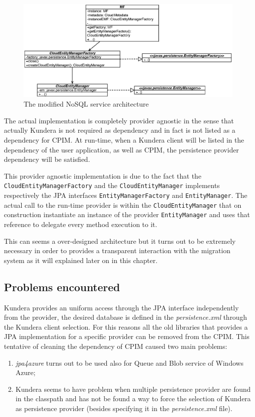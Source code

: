 \begin{figure}[tbh]
  \centering
  \includegraphics[width=14cm]{images/cpim_nosql_kundera}
  \caption{The modified NoSQL service architecture}
  \label{fig:cpim-kundera}
\end{figure}

\noindent The actual implementation is completely provider agnostic in the sense that actually Kundera is not required as dependency and in fact is not listed as a dependency for CPIM. At run-time, when a Kundera client will be listed in the dependency of the user application, as well as CPIM, the persistence provider dependency will be satisfied.

\noindent This provider agnostic implementation is due to the fact that the \texttt{CloudEntityManagerFactory} and the \texttt{CloudEntityManager} implements respectively the JPA interfaces  \texttt{EntityManagerFactory}  and \texttt{EntityManager}.
The actual call to the run-time provider is within the \texttt{CloudEntityManager} that on construction instantiate an instance of the provider \texttt{EntityManager} and uses that reference to delegate every method execution to it.

\noindent This can seems a over-designed architecture but it turns out to be extremely necessary in order to provides a transparent interaction with the migration system as it will explained later on in this chapter.

\subsection{Problems encountered}
Kundera provides an uniform access through the JPA interface independently from the provider, the desired database is defined in the \textit{persistence.xml} through the Kundera client selection. For this reasons all the old libraries that provides a JPA implementation for a specific provider can be removed from the CPIM. 
This tentative of cleaning the dependency of CPIM caused two main problems:
\begin{enumerate}
\item \textit{jpa4azure} turns out to be used also for Queue and Blob service of Windows Azure;
\item Kundera seems to have problem when multiple persistence provider are found in the classpath and has not be found a way to force the selection of Kundera as persistence provider (besides specifying it in the \textit{persistence.xml} file).
\end{enumerate} 

